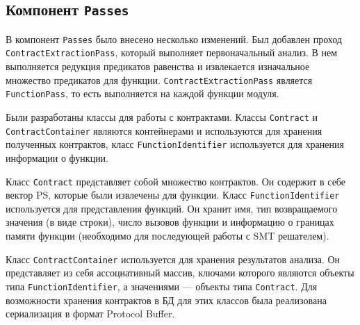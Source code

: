 \subsection{Компонент \texttt{Passes}}
В компонент \texttt{Passes} было внесено несколько изменений. Был добавлен проход \texttt{ContractExtractionPass}, который выполняет первоначальный анализ. В нем выполняется редукция предикатов равенства и извлекается изначальное множество предикатов для функции. \texttt{ContractExtractionPass} является \texttt{FunctionPass}, то есть выполняется на каждой функции модуля.

Были разработаны классы для работы с контрактами. Классы \texttt{Contract} и \texttt{ContractContainer} являются контейнерами и используются для хранения полученных контрактов, класс \texttt{FunctionIdentifier} используется для хранения информации о функции. 

Класс \texttt{Contract} представляет собой множество контрактов. Он содержит в себе вектор PS, которые были извлечены для функции. Класс \texttt{FunctionIdentifier} используется для представления функций. Он хранит имя,  тип возвращаемого значения (в виде строки), число вызовов функции и информацию о границах памяти функции (необходимо для последующей работы с SMT решателем). 

Класс \texttt{ContractContainer} используется для хранения результатов анализа. Он представляет из себя ассоциативный массив, ключами которого являются объекты типа \texttt{FunctionIdentifier}, а значениями --- объекты типа \texttt{Contract}. Для возможности хранения контрактов в БД для этих классов была реализована сериализация в формат Protocol Buffer\cite{protobuf}. 

